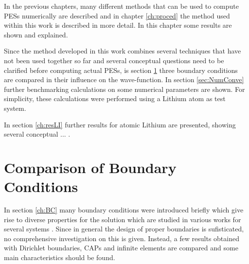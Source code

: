 In the previous chapters, many different methods that can be used to compute PESs numerically are described and in chapter \ref{ch:proced} the method used within this work is described in more detail.
In this chapter some results are shown and explained.

Since the method developed in this work combines several techniques that have not been used together so far and several conceptual questions need to be clarified before computing actual PESs, is section \ref{ch:BCbench} three boundary conditions are compared in their influence on the wave-function. In section \ref{sec:NumConve} further benchmarking calculations on some numerical parameters are shown.
For simplicity, these calculations were performed using a Lithium atom as test system.

In section \ref{ch:resLI} further results for atomic Lithium are presented, showing several conceptual ... .


\section{Comparison of Boundary Conditions}
\label{ch:BCbench}
In section \ref{ch:BC} many boundary conditions were introduced briefly which give rise to diverse properties for the solution which are studied in various works for several systems \cite{babuska}.
Since in general the design of proper boundaries is sufisticated, no comprehensive investigation on this is given.
Instead, a few results obtained with Dirichlet boundaries, CAPs and infinite elements are compared and some main characteristics should be found.

